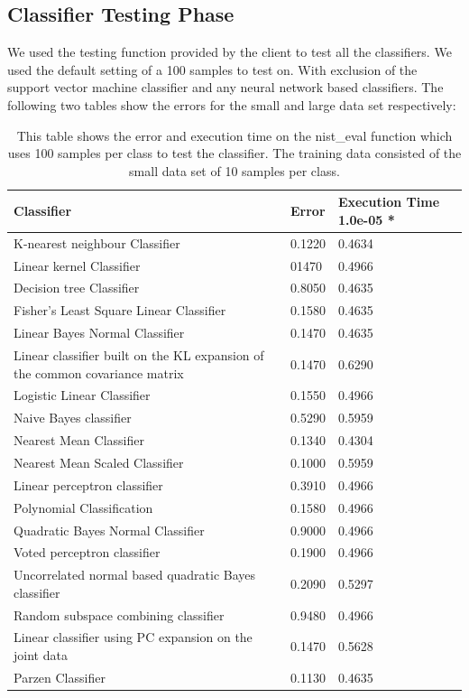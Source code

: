 \documentclass[%
        compressed,
        final,
        notitlepage,
        narroweqnarray,
        inline,
        twoside,
        ]{ieee}
\begin{document}
\subsection{Classifier Testing Phase}
We used the testing function provided by the client to test all the classifiers.
We used the default setting of a 100 samples to test on. With exclusion of the
support vector machine classifier and any neural network based classifiers. The
following two tables show the errors for the small and large data set
respectively:\\
\begin{table}
    \begin{tabular} {p{5cm}lp{1.5cm}} %
        \hline
    Classifier & Error & Execution Time 1.0e-05 * \\
        \hline
K-nearest neighbour Classifier & 0.1220 & 0.4634 \\
Linear kernel Classifier & 01470 & 0.4966 \\
Decision tree Classifier & 0.8050 & 0.4635 \\
Fisher's Least Square Linear Classifier & 0.1580 & 0.4635 \\
Linear Bayes Normal Classifier & 0.1470 & 0.4635 \\
Linear classifier built on the KL expansion of the common covariance matrix & 0.1470 & 0.6290 \\
Logistic Linear Classifier & 0.1550 & 0.4966 \\
Naive Bayes classifier & 0.5290 & 0.5959 \\
Nearest Mean Classifier & 0.1340 & 0.4304 \\
Nearest Mean Scaled Classifier & 0.1000 & 0.5959 \\
Linear perceptron classifier & 0.3910 & 0.4966 \\
Polynomial Classification & 0.1580 & 0.4966 \\
Quadratic Bayes Normal Classifier & 0.9000 & 0.4966 \\
Voted perceptron classifier & 0.1900 & 0.4966 \\
Uncorrelated normal based quadratic Bayes classifier & 0.2090 & 0.5297 \\
Random subspace combining classifier & 0.9480 & 0.4966 \\
Linear classifier using PC expansion on the joint data & 0.1470 & 0.5628 \\
Parzen Classifier & 0.1130 & 0.4635 \\
        \hline
    \end{tabular}
    \caption{
        This table shows the error and execution time on the nist\_eval function
        which uses 100 samples per class to test the classifier. The training
        data consisted of the small data set of 10 samples per class. }
\end{table}
\end{document}
